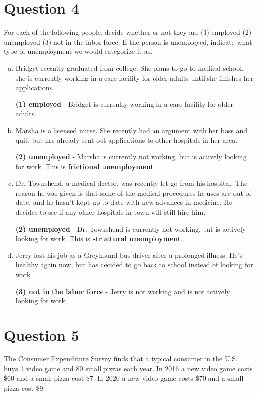 \documentclass{article}
\newcommand{\question}[1]{\pagebreak\section{Question #1}}
\begin{document}
\pagebreak

\question{4}

For each of the following people, decide whether or not they are (1) employed (2) unemployed (3) not in the labor force. If the person is unemployed, indicate what type of unemployment we would categorize it as.

\begin{enumerate}[(a)]
    \item Bridget recently graduated from college. She plans to go to medical school, she is currently working in a care facility for older adults until she finishes her applications.
    
    \textbf{(1) employed} - Bridget is currently working in a care facility for older adults.

    \item Marsha is a licensed nurse. She recently had an argument with her boss and quit, but has already sent out applications to other hospitals in her area.
    
    \textbf{(2) unemployed} - Marsha is currently not working, but is actively looking for work. This is \textbf{frictional unemployment}.

    \item Dr. Townshend, a medical doctor, was recently let go from his hospital. The reason he was given is that some of the medical procedures he uses are out-of-date, and he hasn’t kept up-to-date with new advances in medicine. He decides to see if any other hospitals in town will still hire him.
    
    \textbf{(2) unemployed} - Dr. Townshend is currently not working, but is actively looking for work. This is \textbf{structural unemployment}.

    \item Jerry lost his job as a Greyhound bus driver after a prolonged illness. He's healthy again now, but has decided to go back to school instead of looking for work
    
    \textbf{(3) not in the labor force} - Jerry is not working and is not actively looking for work.

\end{enumerate}

\pagebreak

\question{5}

The Consumer Expenditure Survey finds that a typical consumer in the U.S. buys 1 video game and 80 small pizzas each year. In 2016 a new video game costs \$60 and a small pizza cost \$7. In 2020 a new video game costs \$70 and a small pizza cost \$9.
\end{document}
